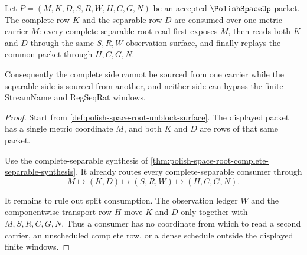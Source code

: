 \begin{theorem}
\label{thm:polish-space-complete-separable-unblock-package}
Let $P=(M,K,D,S,R,W,H,C,G,N)$ be an accepted $\PolishSpaceUp$ packet. The
complete row $K$ and the separable row $D$ are consumed over one metric carrier
$M$: every complete-separable root read first exposes $M$, then reads both
$K$ and $D$ through the same $S,R,W$ observation surface, and finally replays
the common packet through $H,C,G,N$.

Consequently the complete side cannot be sourced from one carrier while the
separable side is sourced from another, and neither side can bypass the
finite StreamName and RegSeqRat windows.
\end{theorem}
\begin{proof}
Start from \autoref{def:polish-space-root-unblock-surface}. The displayed
packet has a single metric coordinate $M$, and both $K$ and $D$ are rows of
that same packet.

Use the complete-separable synthesis of
\autoref{thm:polish-space-root-complete-separable-synthesis}. It already
routes every complete-separable consumer through
$$
M \longmapsto (K,D) \longmapsto (S,R,W) \longmapsto (H,C,G,N).
$$

It remains to rule out split consumption. The observation ledger $W$ and the
componentwise transport row $H$ move $K$ and $D$ only together with $M,S,R,C,G,N$.
Thus a consumer has no coordinate from which to read a second carrier, an
unscheduled complete row, or a dense schedule outside the displayed finite
windows.
\end{proof}

